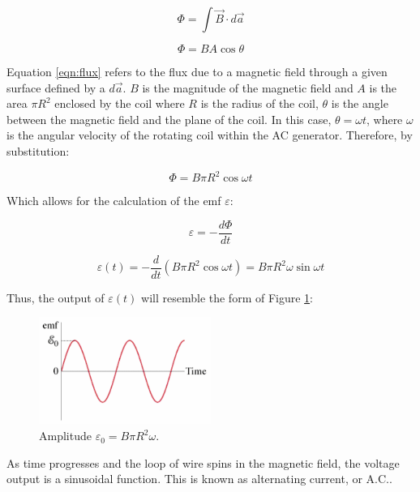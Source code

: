     \begin{equation}
        \Phi = \int \vec{B} \cdot d\vec{a}
        \label{eqn:flux}
    \end{equation}
    
    \[ \Phi = BA\cos\theta \]
    
    Equation \ref{eqn:flux} refers to the flux due to a magnetic field through a given surface defined by a $d\vec{a}$. $B$ is the magnitude of the magnetic field and $A$ is the area $\pi R^{2}$ enclosed by the coil where $R$ is the radius of the coil, $\theta$ is the angle between the magnetic field and the plane of the coil. In this case, $\theta = \omega t$, where $\omega$ is the angular velocity of the rotating coil within the AC generator. Therefore, by substitution:
    
    \[ \Phi = B \pi R^{2} \cos\omega t \]
    
    Which allows for the calculation of the emf $\varepsilon$:
    
    \begin{equation}
        \varepsilon = - \frac{d\Phi}{dt}
        \label{emf}
    \end{equation}
    
    \begin{equation}
        \varepsilon (t) = - \frac{d}{dt} (B \pi R^{2} \cos\omega t)
        = B \pi R^{2} \omega \sin\omega t
        \label{emft}
    \end{equation}
    
    Thus, the output of $\varepsilon (t)$ will resemble the form of Figure \ref{fig:emfsine}:
    
    \begin{figure}[H]
        \centering
        \includegraphics[width=0.5\textwidth]{diagrams/emfsine}
        \caption[EMF sine wave]{Amplitude $\varepsilon_{0} = B \pi R^{2} \omega$.}
        \label{fig:emfsine}
    \end{figure}
    
    As time progresses and the loop of wire spins in the magnetic field, the voltage output is a sinusoidal function. This is known as alternating current, or A.C..